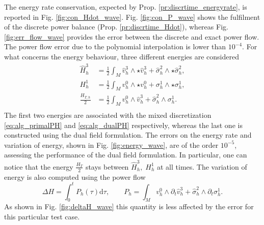 \documentclass{elsarticle}
\renewcommand\d{\ensuremath{\mathrm{d}}}
\newcommand*{\dual}[1]{\ensuremath{\widehat{#1}}}
\begin{document}
The energy rate conservation, expected by Prop. \ref{pr:discrtime_energyrate}, is reported in Fig. \ref{fig:con_Hdot_wave}. Fig. \ref{fig:con_P_wave} shows the fulfilment of the discrete power balance (Prop. \ref{pr:discrtime_Hdot}), whereas Fig. \ref{fig:err_flow_wave} provides the error between the discrete and exact power flow. The power flow error due to the polynomial interpolation is lower than $10^{-4}$. 
For what concerns the energy behaviour, three different energies are considered
\begin{equation*}
\begin{aligned}
    \dual{H}^{3}_h &= \frac{1}{2} \int_M \dual{v}^3_h \wedge \star \dual{v}^3_h + \dual{\sigma}^2_h \wedge \star \dual{\sigma}^2_h, \\
    H^{1}_h&= \frac{1}{2} \int_M v^0_h \wedge \star v^0_h + \sigma^1_h \wedge \star \sigma_h^1, \\
    \frac{H_{T, h}}{2} &= \frac{1}{2} \int_M v^0_h \wedge \dual{v}^3_h + \dual{\sigma}^2_h \wedge \sigma_h^1. \\
\end{aligned}
\end{equation*}
The first two energies are associated with the mixed discretization \eqref{eq:alg_primalPH} and \eqref{eq:alg_dualPH} respectively, whereas the last one is constructed using the dual field formulation. The errors on the energy rate and variation of energy, shown in Fig. \ref{fig:energy_wave}, are of the order $10^{-5}$, assessing the performance of the dual field formulation. In particular, one can notice that the energy $\frac{H_T}{2}$ stays between $\dual{H}^{3}_h, \; H^{1}_h$ at all times. The variation of energy is also computed using the power flow 
\begin{equation*}
    \Delta H = \int_0^t P_h(\tau) \d\tau, \qquad P_h = \int_M v^0_h \wedge \partial_t \dual{v}^3_h + \dual{\sigma}^2_h \wedge \partial_t \sigma_h^1.
\end{equation*}
As shown in Fig. \ref{fig:deltaH_wave} this quantity is less affected by the error for this particular test case. 
\end{document}
